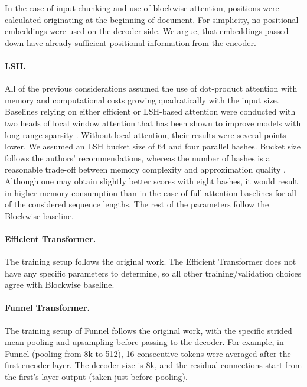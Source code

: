 \documentclass{article}
\begin{document}
{In the case of input chunking and use of blockwise attention, positions were calculated originating at the beginning of document. For simplicity, no positional embeddings were used on the decoder side. We argue, that embeddings passed down have already sufficient positional information from the encoder. 
\paragraph{LSH.}
All of the previous considerations assumed the use of dot-product attention with memory and computational costs growing quadratically with the input size.
Baselines relying on either efficient or LSH-based attention were conducted with two heads of local window attention that has been shown to improve models with long-range sparsity \citep{rae-razavi-2020-transformers}. Without local attention, their results were several points lower. We assumed an LSH bucket size of 64 and four parallel hashes. Bucket size follows the authors' recommendations, whereas the number of hashes is a reasonable trade-off between memory complexity and approximation quality \citep{Kitaev2020ReformerTE}. Although one may obtain slightly better scores with eight hashes, it would result in higher memory consumption than in the case of full attention baselines for all of the considered sequence lengths. The rest of the parameters follow the Blockwise baseline.

\paragraph{Efficient Transformer.}
The training setup follows the original work. The Efficient Transformer does not have any specific parameters to determine, so all other training/validation choices agree with Blockwise baseline. 

\paragraph{Funnel Transformer.}
The training setup of Funnel follows the original work, with the specific strided mean pooling and upsampling before passing to the decoder. For example, in Funnel  (pooling from 8k to 512), 16 consecutive tokens were averaged after the first encoder layer. The decoder size is 8k, and the residual connections start from the first's layer output (taken just before pooling).

}
\end{document}
